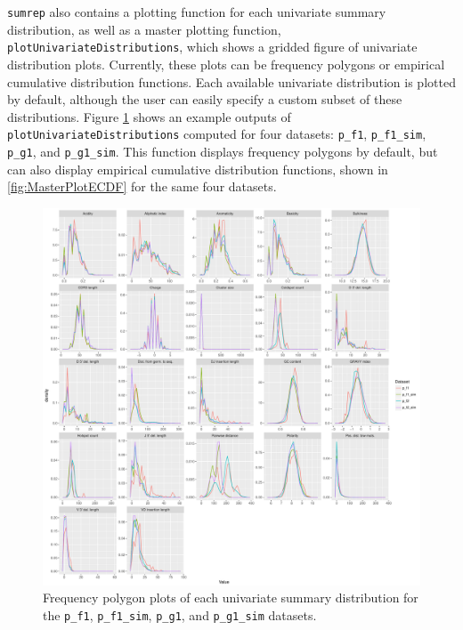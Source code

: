 \documentclass{article}
\begin{document}
\texttt{sumrep} also contains a plotting function for each univariate summary distribution, as well as a master plotting function, \texttt{plotUnivariateDistributions}, which shows a gridded figure of univariate distribution plots.
Currently, these plots can be frequency polygons or empirical cumulative distribution functions.
Each available univariate distribution is plotted by default, although the user can easily specify a custom subset of these distributions.
Figure \ref{fig:MasterPlot} shows an example outputs of \texttt{plotUnivariateDistributions} computed for four datasets: \texttt{p\_f1}, \texttt{p\_f1\_sim}, \texttt{p\_g1}, and \texttt{p\_g1\_sim}.
This function displays frequency polygons by default, but can also display empirical cumulative distribution functions, shown in \ref{fig:MasterPlotECDF} for the same four datasets.
\begin{figure}
    \includegraphics[width=\linewidth]{Figures/master_plot_freqpoly.pdf}
    \caption{Frequency polygon plots of each univariate summary distribution for the \texttt{p\_f1}, \texttt{p\_f1\_sim}, \texttt{p\_g1}, and \texttt{p\_g1\_sim} datasets.}
    \label{fig:MasterPlot}
\end{figure}
\end{document}
